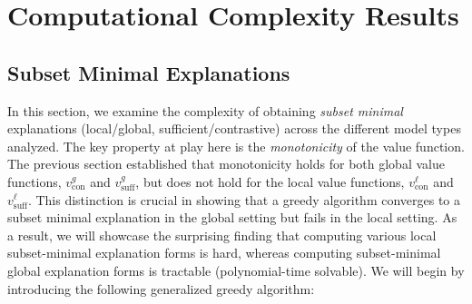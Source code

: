 \documentclass{article}
\newtheorem{theorem}{Theorem}
\DeclareMathOperator*{\argmax}{argmax} %
\begin{document}

\section{Computational Complexity Results}

\subsection{Subset Minimal Explanations}
\label{subsection_subset_minimal}

In this section, we examine the complexity of obtaining \emph{subset minimal} explanations (local/global, sufficient/contrastive) across the different model types analyzed. The key property at play here is the \emph{monotonicity} of the value function. The previous section established that monotonicity holds for both global value functions, $v^g_{\text{con}}$ and $v^g_{\text{suff}}$, but does not hold for the local value functions, $v^{\ell}_{\text{con}}$ and $v^{\ell}_{\text{suff}}$. This distinction is crucial in showing that a greedy algorithm converges to a subset minimal explanation in the global setting but fails in the local setting. As a result, we will showcase the surprising finding that computing various local subset-minimal explanation forms is hard, whereas computing subset-minimal global explanation forms is tractable (polynomial-time solvable). We will begin by introducing the following generalized greedy algorithm:


\end{document}
